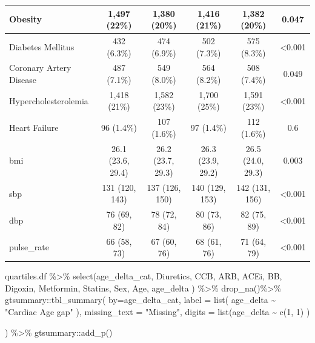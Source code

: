 \documentclass[
]{article}
\newenvironment{Shaded}{\begin{snugshade}}{\end{snugshade}}
\newcommand{\AttributeTok}[1]{\textcolor[rgb]{0.77,0.63,0.00}{#1}}
\newcommand{\DecValTok}[1]{\textcolor[rgb]{0.00,0.00,0.81}{#1}}
\newcommand{\FunctionTok}[1]{\textcolor[rgb]{0.00,0.00,0.00}{#1}}
\newcommand{\NormalTok}[1]{#1}
\newcommand{\SpecialCharTok}[1]{\textcolor[rgb]{0.00,0.00,0.00}{#1}}
\newcommand{\StringTok}[1]{\textcolor[rgb]{0.31,0.60,0.02}{#1}}
\begin{document}
\begin{tabular}{l|c|c|c|c|c}
\hline
Obesity & 1,497 (22\%) & 1,380 (20\%) & 1,416 (21\%) & 1,382 (20\%) & 0.047\\
\hline
Diabetes Mellitus & 432 (6.3\%) & 474 (6.9\%) & 502 (7.3\%) & 575 (8.3\%) & <0.001\\
\hline
Coronary Artery Disease & 487 (7.1\%) & 549 (8.0\%) & 564 (8.2\%) & 508 (7.4\%) & 0.049\\
\hline
Hypercholesterolemia & 1,418 (21\%) & 1,582 (23\%) & 1,700 (25\%) & 1,591 (23\%) & <0.001\\
\hline
Heart Failure & 96 (1.4\%) & 107 (1.6\%) & 97 (1.4\%) & 112 (1.6\%) & 0.6\\
\hline
bmi & 26.1 (23.6, 29.4) & 26.2 (23.7, 29.3) & 26.3 (23.9, 29.2) & 26.5 (24.0, 29.3) & 0.003\\
\hline
sbp & 131 (120, 143) & 137 (126, 150) & 140 (129, 153) & 142 (131, 156) & <0.001\\
\hline
dbp & 76 (69, 82) & 78 (72, 84) & 80 (73, 86) & 82 (75, 89) & <0.001\\
\hline
pulse\_rate & 66 (58, 73) & 67 (60, 76) & 68 (61, 76) & 71 (64, 79) & <0.001\\
\hline
\end{tabular}

\begin{Shaded}
\begin{Highlighting}[]
\NormalTok{quartiles.df }\SpecialCharTok{\%\textgreater{}\%}
  \FunctionTok{select}\NormalTok{(age\_delta\_cat,}
\NormalTok{         Diuretics,}
\NormalTok{         CCB,}
\NormalTok{         ARB,}
\NormalTok{         ACEi,}
\NormalTok{         BB,}
\NormalTok{         Digoxin,}
\NormalTok{         Metformin,}
\NormalTok{         Statins,}
\NormalTok{         Sex,}
\NormalTok{         Age,}
\NormalTok{         age\_delta}
\NormalTok{         ) }\SpecialCharTok{\%\textgreater{}\%} 
  \FunctionTok{drop\_na}\NormalTok{()}\SpecialCharTok{\%\textgreater{}\%}
\NormalTok{  gtsummary}\SpecialCharTok{::}\FunctionTok{tbl\_summary}\NormalTok{(}
    \AttributeTok{by=}\NormalTok{age\_delta\_cat,}
    \AttributeTok{label  =} \FunctionTok{list}\NormalTok{(}
\NormalTok{      age\_delta   }\SpecialCharTok{\textasciitilde{}} \StringTok{"Cardiac Age gap"}
\NormalTok{    ),}
    \AttributeTok{missing\_text =} \StringTok{"Missing"}\NormalTok{,}
    \AttributeTok{digits =} \FunctionTok{list}\NormalTok{(age\_delta }\SpecialCharTok{\textasciitilde{}} \FunctionTok{c}\NormalTok{(}\DecValTok{1}\NormalTok{, }\DecValTok{1}\NormalTok{)}
\NormalTok{                  )}
    
\NormalTok{  ) }\SpecialCharTok{\%\textgreater{}\%}
\NormalTok{  gtsummary}\SpecialCharTok{::}\FunctionTok{add\_p}\NormalTok{()}
\end{Highlighting}
\end{Shaded}
\end{document}
